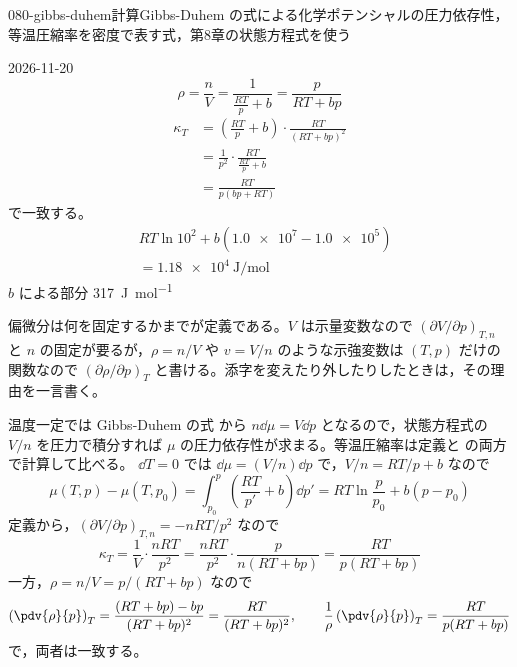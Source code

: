 \documentclass[uplatex,dvipdfmx,a4paper,11pt]{jsarticle}
\begin{document}
\begin{mondai}{080-gibbs-duhem}{計算}{Gibbs-Duhem の式による化学ポテンシャルの圧力依存性，等温圧縮率を密度で表す式，第8章の状態方程式を使う}
\begin{kotaeutsushi}{2026-11-20}
\[ \rho=\frac{n}{V}=\frac{1}{\frac{RT}{p}+b}=\frac{p}{RT+bp} \]
\begin{align*}
\kappa_{T}&=\left(\frac{RT}{p}+b\right)\cdot\frac{RT}{(RT+bp)^{2}}\\
&=\frac{1}{p^{2}}\cdot\frac{RT}{\frac{RT}{p}+b}\\
&=\frac{RT}{p(bp+RT)}
\end{align*}
で一致する。
\begin{align*}
&RT\ln10^{2}+b(\num{1.0e7}-\num{1.0e5})\\
&=\qty{1.18e4}{\joule\per\mole}
\end{align*}
$b$ による部分 \qty{317}{\joule\per\mole}
\end{kotaeutsushi}
\begin{kizuki}
\item {} 偏微分は何を固定するかまでが定義である。$V$ は示量変数なので $(\partial V/\partial p)_{T,n}$ と $n$ の固定が要るが，$\rho=n/V$ や $v=V/n$ のような示強変数は $(T,p)$ だけの関数なので $(\partial\rho/\partial p)_{T}$ と書ける。添字を変えたり外したりしたときは，その理由を一言書く。
\end{kizuki}
\begin{tadashii}
\houshin 温度一定では Gibbs-Duhem の式  から $n\dd\mu = V\dd p$ となるので，状態方程式の $V/n$ を圧力で積分すれば $\mu$ の圧力依存性が求まる。等温圧縮率は定義と  の両方で計算して比べる。
\keisan {} $\dd T = 0$ では $\dd\mu = (V/n)\dd p$ で，$V/n = RT/p + b$ なので
\[ \mu(T,p) - \mu(T,p_{0}) = \int_{p_{0}}^{p}\left(\frac{RT}{p'} + b\right)\dd p' = RT\ln\frac{p}{p_{0}} + b(p - p_{0}) \]
 定義から，$(\partial V/\partial p)_{T,n} = -nRT/p^{2}$ なので
\[ \kappa_{T} = \frac{1}{V}\cdot\frac{nRT}{p^{2}} = \frac{nRT}{p^{2}}\cdot\frac{p}{n(RT + bp)} = \frac{RT}{p(RT + bp)} \]
一方，$\rho = n/V = p/(RT + bp)$ なので
\[ \left(\pdv{\rho}{p}\right)_{T} = \frac{(RT + bp) - bp}{(RT + bp)^{2}} = \frac{RT}{(RT + bp)^{2}}, \qquad \frac{1}{\rho}\left(\pdv{\rho}{p}\right)_{T} = \frac{RT}{p(RT + bp)} \]
で，両者は一致する。


\end{tadashii}
\end{mondai}
\end{document}
